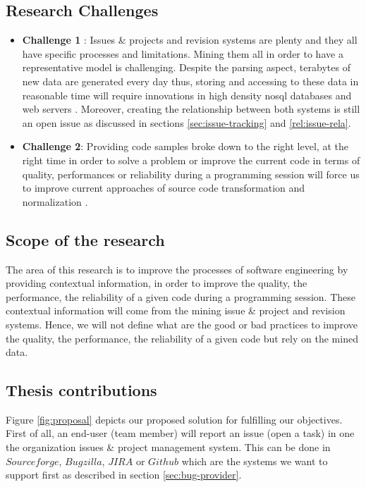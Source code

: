 \subsection{Research Challenges\label{sec:challenges}}

\begin{itemize}
	\item {\bf Challenge 1} : Issues \& projects and revision systems are plenty and they all have specific processes and limitations. Mining them all in order to have a representative model is challenging. Despite the parsing aspect, terabytes of new data are generated every day thus, storing and accessing to these data in reasonable time will require innovations in high density nosql databases \cite{Nayrolles2014b} and web servers \cite{Nayrolles2013b}. Moreover, creating the relationship between both systems is still an open issue as discussed in sections \ref{sec:issue-tracking} and \ref{rel:issue-rela}.

	\item {\bf Challenge 2}: Providing code samples broke down to the right level, at the right time in order to solve a problem  or improve the current code in terms of quality, performances or reliability during a programming session will force us to improve current approaches of source code transformation and normalization \cite{Cordy2006a, Cordy2006, Roy2008, Cordy2011}.
\end{itemize}

\subsection{Scope of the research \label{sec:scope}}

The area of this research is to improve the processes of software engineering by providing contextual information, in order to improve the quality, the performance, the reliability of a given code during a programming session. These contextual information will come from the mining issue \& project and revision systems. Hence, we will not define what are the good or bad practices to improve the quality, the performance, the reliability of a given code but rely on the mined data.

\subsection{Thesis contributions\label{sec:objective-thesis}}

Figure \ref{fig:proposal} depicts our proposed solution for fulfilling our objectives.
First of all, an end-user (team member) will report an issue (open a task) in one the organization issues \& project management system. This can be done in $Sourceforge$, $Bugzilla$, $JIRA$ or $Github$ which are the systems we want to support first as described in section \ref{sec:bug-provider}.

